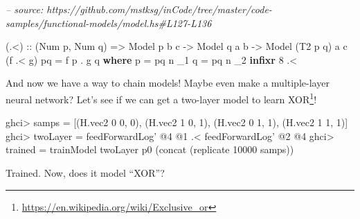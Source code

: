 \documentclass[]{article}
\newenvironment{Shaded}{}{}
\newcommand{\CommentTok}[1]{\textcolor[rgb]{0.38,0.63,0.69}{\textit{#1}}}
\newcommand{\DataTypeTok}[1]{\textcolor[rgb]{0.56,0.13,0.00}{#1}}
\newcommand{\DecValTok}[1]{\textcolor[rgb]{0.25,0.63,0.44}{#1}}
\newcommand{\FunctionTok}[1]{\textcolor[rgb]{0.02,0.16,0.49}{#1}}
\newcommand{\KeywordTok}[1]{\textcolor[rgb]{0.00,0.44,0.13}{\textbf{#1}}}
\newcommand{\NormalTok}[1]{#1}
\newcommand{\OtherTok}[1]{\textcolor[rgb]{0.00,0.44,0.13}{#1}}
\renewcommand{\href}[2]{#2\footnote{\url{#1}}}
\begin{document}
\begin{Shaded}
\begin{Highlighting}[]
\CommentTok{-- source: https://github.com/mstksg/inCode/tree/master/code-samples/functional-models/model.hs#L127-L136}

\NormalTok{(}\FunctionTok{.<}\NormalTok{)}
\OtherTok{    ::}\NormalTok{ (}\DataTypeTok{Num}\NormalTok{ p, }\DataTypeTok{Num}\NormalTok{ q)}
    \OtherTok{=>} \DataTypeTok{Model}\NormalTok{ p b c}
    \OtherTok{->} \DataTypeTok{Model}\NormalTok{ q a b}
    \OtherTok{->} \DataTypeTok{Model}\NormalTok{ (}\DataTypeTok{T2}\NormalTok{ p q) a c}
\NormalTok{(f }\FunctionTok{.<}\NormalTok{ g) pq }\FunctionTok{=}\NormalTok{ f p }\FunctionTok{.}\NormalTok{ g q}
  \KeywordTok{where}
\NormalTok{    p }\FunctionTok{=}\NormalTok{ pq }\FunctionTok{^^.}\NormalTok{ _1}
\NormalTok{    q }\FunctionTok{=}\NormalTok{ pq }\FunctionTok{^^.}\NormalTok{ _2}
\KeywordTok{infixr} \DecValTok{8} \FunctionTok{.<}
\end{Highlighting}
\end{Shaded}

And now we have a way to chain models! Maybe even make a multiple-layer neural
network? Let's see if we can get a two-layer model to learn
\href{https://en.wikipedia.org/wiki/Exclusive_or}{XOR}!

\begin{Shaded}
\begin{Highlighting}[]
\NormalTok{ghci}\FunctionTok{>}\NormalTok{ samps }\FunctionTok{=}\NormalTok{ [(H.vec2 }\DecValTok{0} \DecValTok{0}\NormalTok{, }\DecValTok{0}\NormalTok{), (H.vec2 }\DecValTok{1} \DecValTok{0}\NormalTok{, }\DecValTok{1}\NormalTok{), (H.vec2 }\DecValTok{0} \DecValTok{1}\NormalTok{, }\DecValTok{1}\NormalTok{), (H.vec2 }\DecValTok{1} \DecValTok{1}\NormalTok{, }\DecValTok{1}\NormalTok{)]}
\NormalTok{ghci}\FunctionTok{>}\NormalTok{ twoLayer }\FunctionTok{=}\NormalTok{ feedForwardLog' }\FunctionTok{@}\DecValTok{4} \FunctionTok{@}\DecValTok{1} \FunctionTok{.<}\NormalTok{ feedForwardLog' }\FunctionTok{@}\DecValTok{2} \FunctionTok{@}\DecValTok{4}
\NormalTok{ghci}\FunctionTok{>}\NormalTok{ trained }\FunctionTok{=}\NormalTok{ trainModel twoLayer p0 (concat (replicate }\DecValTok{10000}\NormalTok{ samps))}
\end{Highlighting}
\end{Shaded}

Trained. Now, does it model ``XOR''?
\end{document}
